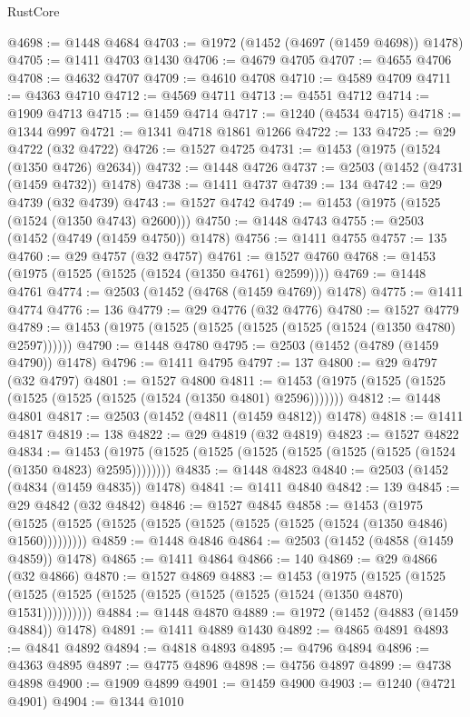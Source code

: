 \begin{lexlean}{RustCore}
\begin{coremodule}
@4698 := @1448 @4684
@4703 := @1972 (@1452 (@4697 (@1459 @4698)) @1478)
@4705 := @1411 @4703 @1430
@4706 := @4679 @4705
@4707 := @4655 @4706
@4708 := @4632 @4707
@4709 := @4610 @4708
@4710 := @4589 @4709
@4711 := @4363 @4710
@4712 := @4569 @4711
@4713 := @4551 @4712
@4714 := @1909 @4713
@4715 := @1459 @4714
@4717 := @1240 (@4534 @4715)
@4718 := @1344 @997
@4721 := @1341 @4718 @1861 @1266
@4722 := 133
@4725 := @29 @4722 (@32 @4722)
@4726 := @1527 @4725
@4731 := @1453 (@1975 (@1524 (@1350 @4726) @2634))
@4732 := @1448 @4726
@4737 := @2503 (@1452 (@4731 (@1459 @4732)) @1478)
@4738 := @1411 @4737
@4739 := 134
@4742 := @29 @4739 (@32 @4739)
@4743 := @1527 @4742
@4749 := @1453 (@1975 (@1525 (@1524 (@1350 @4743) @2600)))
@4750 := @1448 @4743
@4755 := @2503 (@1452 (@4749 (@1459 @4750)) @1478)
@4756 := @1411 @4755
@4757 := 135
@4760 := @29 @4757 (@32 @4757)
@4761 := @1527 @4760
@4768 := @1453 (@1975 (@1525 (@1525 (@1524 (@1350 @4761) @2599))))
@4769 := @1448 @4761
@4774 := @2503 (@1452 (@4768 (@1459 @4769)) @1478)
@4775 := @1411 @4774
@4776 := 136
@4779 := @29 @4776 (@32 @4776)
@4780 := @1527 @4779
@4789 := @1453 (@1975 (@1525 (@1525 (@1525 (@1525 (@1524 (@1350 @4780) @2597))))))
@4790 := @1448 @4780
@4795 := @2503 (@1452 (@4789 (@1459 @4790)) @1478)
@4796 := @1411 @4795
@4797 := 137
@4800 := @29 @4797 (@32 @4797)
@4801 := @1527 @4800
@4811 := @1453 (@1975 (@1525 (@1525 (@1525 (@1525 (@1525 (@1524 (@1350 @4801) @2596)))))))
@4812 := @1448 @4801
@4817 := @2503 (@1452 (@4811 (@1459 @4812)) @1478)
@4818 := @1411 @4817
@4819 := 138
@4822 := @29 @4819 (@32 @4819)
@4823 := @1527 @4822
@4834 := @1453 (@1975 (@1525 (@1525 (@1525 (@1525 (@1525 (@1525 (@1524 (@1350 @4823) @2595))))))))
@4835 := @1448 @4823
@4840 := @2503 (@1452 (@4834 (@1459 @4835)) @1478)
@4841 := @1411 @4840
@4842 := 139
@4845 := @29 @4842 (@32 @4842)
@4846 := @1527 @4845
@4858 := @1453
    (@1975 (@1525 (@1525 (@1525 (@1525 (@1525 (@1525 (@1525 (@1524 (@1350 @4846) @1560)))))))))
@4859 := @1448 @4846
@4864 := @2503 (@1452 (@4858 (@1459 @4859)) @1478)
@4865 := @1411 @4864
@4866 := 140
@4869 := @29 @4866 (@32 @4866)
@4870 := @1527 @4869
@4883 := @1453
    (@1975
      (@1525 (@1525 (@1525 (@1525 (@1525 (@1525 (@1525 (@1525 (@1524 (@1350 @4870) @1531))))))))))
@4884 := @1448 @4870
@4889 := @1972 (@1452 (@4883 (@1459 @4884)) @1478)
@4891 := @1411 @4889 @1430
@4892 := @4865 @4891
@4893 := @4841 @4892
@4894 := @4818 @4893
@4895 := @4796 @4894
@4896 := @4363 @4895
@4897 := @4775 @4896
@4898 := @4756 @4897
@4899 := @4738 @4898
@4900 := @1909 @4899
@4901 := @1459 @4900
@4903 := @1240 (@4721 @4901)
@4904 := @1344 @1010

\end{coremodule}
\end{lexlean}
